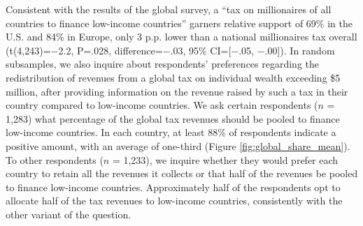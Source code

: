 Consistent with the results of the global survey, 
a ``tax on millionaires of all countries to finance low-income countries'' garners relative support of 69\% in the U.S. and 84\% in Europe, only 3 p.p. lower than a national millionaires tax overall (t(4,243)=$-$2.2, P=.028, difference=$-$.03, 95\% CI=[$-$.05, $-$.00]). In random subsamples, we also inquire about respondents' preferences regarding the redistribution of revenues from a global tax on individual wealth exceeding \$5 million, after providing information on the revenue raised by such a tax in their country compared to low-income countries. 
We ask certain respondents ($n$ = 1,283) what percentage of the global tax revenues should be pooled to finance low-income countries. In each country, at least 88\% of respondents indicate a positive amount, with an average of one-third %
(Figure \ref{fig:global_share_mean}). To other respondents ($n$ = 1,233), we inquire whether they would prefer each country to retain all the revenues it collects or that half of the revenues be pooled to finance low-income countries. Approximately half of the respondents opt to allocate half of the tax revenues to low-income countries, consistently with the other variant of the question.


